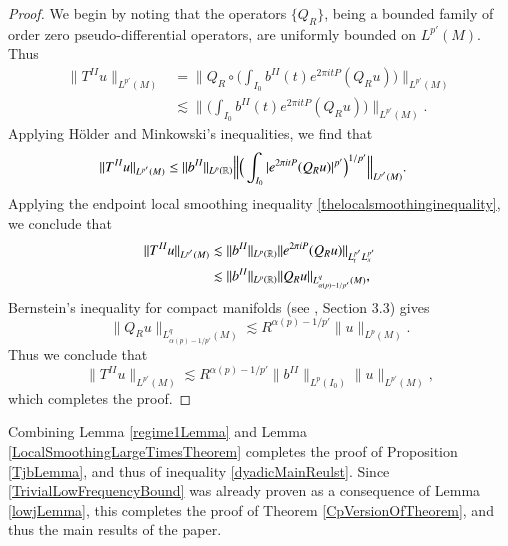 \begin{proof}
    We begin by noting that the operators $\{ Q_R \}$, being a bounded family of order zero pseudo-differential operators, are uniformly bounded on $L^{p'}(M)$. Thus
    \begin{equation}
    \begin{split}
        \| T^{II} u \|_{L^{p'}(M)} &= \Big\| Q_R \circ \Big( \int_{I_0} b^{II}(t) e^{2 \pi i tP} (Q_R u) \Big) \Big\|_{L^{p'}(M)}\\
        &\lesssim \Big\| \Big( \int_{I_0} b^{II}(t) e^{2 \pi i tP} (Q_R u) \Big) \Big\|_{L^{p'}(M)}.
    \end{split}
    \end{equation}
    Applying H\"{o}lder and Minkowski's inequalities, we find that
    \begin{equation}
    \begin{split}
        \| T^{II}u \|_{L^{p'}(M)} &\leq \| b^{II} \|_{L^p(\operatorname{\mathbb{R}})} \Big\| \Big( \int_{I_0} |e^{2 \pi i t P} (Q_R u)|^{p'} \Big)^{1/p'} \Big\|_{L^{p'}(M)}.
    \end{split}
    \end{equation}
    Applying the endpoint local smoothing inequality \eqref{thelocalsmoothinginequality}, we conclude that
    \begin{equation}
    \begin{split}
        \| T^{II} u \|_{L^{p'}(M)} &\lesssim \| b^{II} \|_{L^p(\operatorname{\mathbb{R}})}  \| e^{2 \pi i P} (Q_R u) \|_{L^{p'}_t L^{p'}_x}\\
        &\lesssim  \| b^{II} \|_{L^p(\operatorname{\mathbb{R}})}  \| Q_R u \|_{L^q_{\alpha(p) - 1/p'}(M)},
    \end{split}
    \end{equation}
    Bernstein's inequality for compact manifolds (see \cite{Sogge}, Section 3.3) gives
    \begin{equation}
        \| Q_R u \|_{L^{q}_{\alpha(p) - 1/p'}(M)} \lesssim R^{\alpha(p) - 1/p'} \| u \|_{L^p(M)}.
    \end{equation}
    Thus we conclude that
    \begin{equation}
        \| T^{II}u \|_{L^{p'}(M)} \lesssim R^{\alpha(p) - 1/p'} \| b^{II} \|_{L^p(I_0)} \| u \|_{L^{p'}(M)},
    \end{equation}
    which completes the proof.
\end{proof}

Combining Lemma \ref{regime1Lemma} and Lemma \ref{LocalSmoothingLargeTimesTheorem} completes the proof of Proposition \ref{TjbLemma}, and thus of inequality \eqref{dyadicMainReulst}. Since \eqref{TrivialLowFrequencyBound} was already proven as a consequence of Lemma \ref{lowjLemma}, this completes the proof of Theorem \ref{CpVersionOfTheorem}, and thus the main results of the paper.

